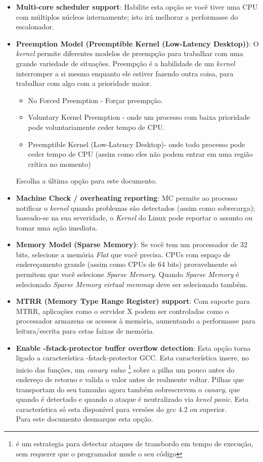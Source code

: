 \documentclass[a4paper,10pt]{article}
\begin{document}
\begin{itemize}
    \item \textbf{Multi-core scheduler support}: Habilite esta opção se você tiver uma CPU com múltiplos núcleos internamente; isto irá melhorar 
	    a performasse do escalonador.
    \item \textbf{Preemption Model (Preemptible Kernel (Low-Latency Desktop))}: O \emph{kernel} permite diferentes modelos de preempção para 
	    trabalhar com uma grande variedade de situações. Preempção é a habilidade de um \emph{kernel} interromper a si mesmo enquanto ele 
	    estiver fazendo outra coisa, para trabalhar com algo com a prioridade maior. 
	    \begin{itemize}
	      \item No Forced Preemption - Forçar preempção.
	      \item Voluntary Kernel Preemption - onde um processo com baixa prioridade pode voluntariamente ceder tempo de CPU.
	      \item Preemptible Kernel (Low-Latency Desktop)- onde todo processo pode ceder tempo de CPU (assim como eles não podem entrar em uma 
	      região crítica no momento)
	    \end{itemize}
	    Escolha a última opção para este documento.
    \item \textbf{Machine Check / overheating reporting}: MC permite ao processo notificar o \emph{kernel} quando problemas são detectados (assim 
	    como sobrecarga); baseado-se na sua severidade, o \emph{Kernel} do Linux pode reportar o assunto ou tomar uma ação imediata.
    \item \textbf{Memory Model (Sparse Memory)}: Se você tem um processador de 32 bits, selecione a memória \emph{Flat} que você precisa. CPUs 
	    com espaço de endereçamento grande (assim como CPUs de 64 bits) provavelmente só permitem que você selecione \emph{Sparse Memory}. 
	    Quando \emph{Sparse Memory} é selecionado \emph{Sparse Memory virtual memmap} deve ser selecionado também.
    \item \textbf{MTRR (Memory Type Range Register) support}: Com suporte para MTRR, aplicações como o servidor X podem ser controladas como o 
	    processador armazena os acessos à memória, aumentando a performasse para leitura/escrita para cetas faixas de memória.
    \item \textbf{Enable -fstack-protector buffer overflow detection}: Esta opção torna ligado a característica -fstack-protector GCC. Esta 
	    característica insere, no inicio das funções, um \emph{canary value} \footnote{é um estrategia para detectar ataques de transbordo 
	    em tempo de execução, sem requerer que o programador mude o seu código} sobre a pilha um pouco antes do endereço de retorno e
	    valida o valor antes de realmente voltar. Pilhas que transportam do seu tamanho agora também sobrescrevem o \emph{canary}, que quando 
	    é detectado e quando o ataque é neutralizado via \emph{kenel panic}. Esta característica só esta disponível para versões do gcc 4.2 
	    ou superior.
	  \\Para este documento desmarque esta opção.
    \end{itemize}
\end{document}

